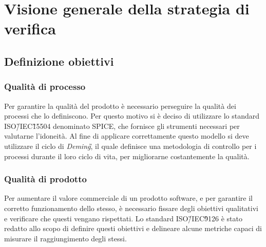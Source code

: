 \section{Visione generale della strategia di verifica}
\subsection{Definizione obiettivi}
\subsubsection{Qualità di processo}
Per garantire la qualità del prodotto è necessario perseguire la qualità dei processi che lo definiscono. Per questo motivo si è deciso di utilizzare lo standard ISO\G/IEC\G 15504 denominato SPICE, che fornisce gli strumenti necessari per valutarne l'idoneità.\newline
Al fine di applicare correttamente questo modello si deve utilizzare il ciclo 
di \textit{Deming}\G, il quale definisce una metodologia di controllo per i 
processi durante il loro ciclo di vita, per migliorarne costantemente la 
qualità.

\subsubsection{Qualità di prodotto}
Per aumentare il valore commerciale di un prodotto software, e per garantire il 
corretto funzionamento dello stesso, è necessario fissare degli obiettivi 
qualitativi e verificare che questi vengano rispettati.\newline
Lo standard ISO\G/IEC\G 9126 è stato redatto allo scopo di definire questi 
obiettivi e delineare alcune metriche capaci di misurare il raggiungimento 
degli stessi.

